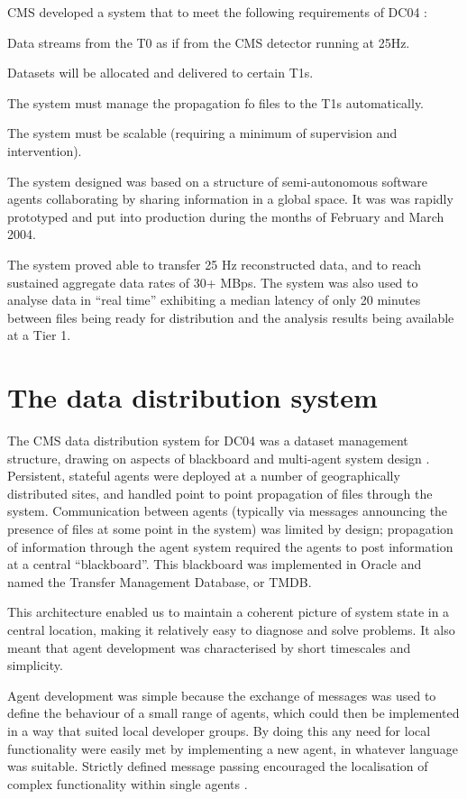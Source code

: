 \documentclass{cmspaper}
\begin{document}
CMS developed a system that to meet the following requirements of
DC04 \cite{dc04plan}:
\begin{list}{}{}
\item Data streams from the T0 as if from the CMS detector running at 25Hz.
\item Datasets will be allocated and delivered to certain T1s.
\item The system must manage the propagation fo files to the T1s automatically.
\item The system must be scalable (requiring a minimum of supervision and intervention).
\end{list}

The system designed was based on a structure of semi-autonomous
software agents collaborating by sharing information in a global
space. It was was rapidly prototyped and put into production during
the months of February and March 2004.

The system proved able to transfer 25 Hz reconstructed data, and to
reach sustained aggregate data rates of 30+ MBps. The system was also
used to analyse data in ``real time'' exhibiting a median latency of
only 20 minutes between files being ready for distribution and the
analysis results being available at a Tier 1.

\section{The data distribution system}
The CMS data distribution system for DC04 was a dataset management
structure, drawing on aspects of blackboard and multi-agent system
design \cite{FG96,C03,Setal03}. Persistent, stateful agents were
deployed at a number of geographically distributed sites, and handled
point to point propagation of files through the system. Communication
between agents (typically via messages announcing the presence of
files at some point in the system) was limited by design; propagation
of information through the agent system required the agents to post
information at a central ``blackboard''. This blackboard was
implemented in Oracle and named the Transfer Management Database, or
TMDB.

This architecture enabled us to maintain a coherent picture of system
state in a central location, making it relatively easy to diagnose and
solve problems. It also meant that agent development was characterised
by short timescales and simplicity.

Agent development was simple because the exchange of messages was used
to define the behaviour of a small range of agents, which could then
be implemented in a way that suited local developer groups. By doing
this any need for local functionality were easily met by implementing
a new agent, in whatever language was suitable. Strictly defined
message passing encouraged the localisation of complex functionality
within single agents \cite{B03}.
\end{document}
